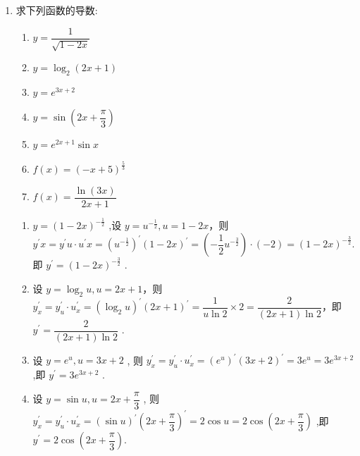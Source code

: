 \begin{enumerate}
    \item 求下列函数的导数:
    \begin{enumerate}
        \item ${y} = \dfrac{1}{\sqrt{1 - 2{x}}}$
        \item $y = {\log }_{2}\left( {{2x} + 1}\right)$
        \item $y = {e}^{{3x} + 2}$
        \item $y = \sin \left( {{2x} + \dfrac{\pi }{3}}\right)$
        \item $y = {e}^{2x+ 1}\sin x$
        \item $f\left( x\right)  = {\left( -x + 5\right) }^{\frac{5}{3}}$
        \item $f\left( x\right)  = \dfrac{\ln \left( {3x}\right) }{{2x} + 1}$
    \end{enumerate}
    \begin{jieda}
        \begin{enumerate}
            \item $y = {\left( 1 - 2x\right) }^{-\frac{1}{2}}$ ,设 $y = {u}^{-\frac{1}{2}},u = 1 - {2x}$，则 ${y}^{\prime }x = {y}^{\prime }u \cdot  {u}^{\prime }x = {\left( {u}^{-\frac{1}{2}}\right) }^{\prime }{\left( 1 - 2x\right) }^{\prime } = \left( {-\dfrac{1}{2}{{u}}^{-\frac{3}{2}}}\right)  \cdot  \left( {-2}\right)  = {\left( 1 - 2{x}\right) }^{-\frac{3}{2}}.$即 ${{y}}^{\prime } = {\left( 1 - 2{x}\right) }^{-\frac{3}{2}}$ .
            
            \item 设 $y = {\log }_{2}u,u = {2x} + 1$，则 ${y}^{\prime }_{x} = {y}^{\prime }_{u} \cdot  {u}^{\prime }_{x} = {\left( {\log }_{2}u\right) }^{\prime }{\left( 2x + 1\right) }^{\prime } = \dfrac{1}{{u}\ln 2} \times  2 = \dfrac{2}{\left( {2{x} + 1}\right) \ln 2}$，即 ${y}^{\prime } = \dfrac{2}{\left( {{2x} + 1}\right) \ln 2}$ .
            
            \item 设 $y = {e}^{u},u = {3x} + 2$ ,
            则 ${{y}}^{\prime }_{{x}} = {{y}}^{\prime }_{{u}} \cdot  {{u}}^{\prime }_{{x}} = {\left( {{e}}^{{u}}\right) }^{\prime }{\left( 3{x} + 2\right) }^{\prime } = 3{{e}}^{{u}} = 3{{e}}^{3{x} + 2}$ ,即 ${{y}}^{\prime } = 3{{e}}^{3{x} + 2}$ .
            
            \item 设 $y = \sin u,u = {2x} + \dfrac{\pi }{3}$ ,
            则 ${y}^{\prime }_x = {y}^{\prime }_u \cdot  {u}^{\prime }_x = {\left( \sin u\right) }^{\prime }{\left( 2x + \dfrac{\pi }{3}\right) }^{\prime } = 2\cos u = 2\cos \left( {{2x} + \dfrac{\pi }{3}}\right)$ ,即 ${y}^{\prime } = 2\cos \left( {{2x} + \dfrac{\pi }{3}}\right)$.


\end{enumerate}
\end{jieda}
\end{enumerate}
